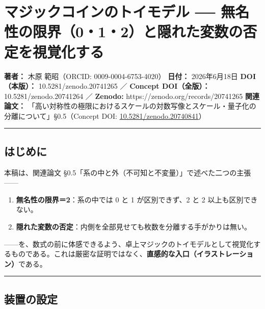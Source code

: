 \documentclass[11pt]{ltjsarticle}
\providecommand{\tightlist}{\setlength{\itemsep}{0pt}\setlength{\parskip}{0pt}}
\begin{document}
\section{マジックコインのトイモデル ──
無名性の限界（0・1・2）と隠れた変数の否定を視覚化する}\label{ux30deux30b8ux30c3ux30afux30b3ux30a4ux30f3ux306eux30c8ux30a4ux30e2ux30c7ux30eb-ux7121ux540dux6027ux306eux9650ux754c012ux3068ux96a0ux308cux305fux5909ux6570ux306eux5426ux5b9aux3092ux8996ux899aux5316ux3059ux308b}

\textbf{著者：} 木原 範昭（ORCID: 0009-0004-6753-4020） \textbf{日付：}
2026年6月18日 \textbf{DOI（本版）：} 10.5281/zenodo.20741265 ／
\textbf{Concept DOI（全版）：} 10.5281/zenodo.20741264 ／
\textbf{Zenodo:} https://zenodo.org/records/20741265 \textbf{関連論文：}
「高い対称性の極限におけるスケールの対数写像とスケール・量子化の分離について」§0.5（Concept
DOI:
\href{https://doi.org/10.5281/zenodo.20740841}{10.5281/zenodo.20740841}）

\begin{center}\rule{0.5\linewidth}{0.5pt}\end{center}

\subsection{はじめに}\label{ux306fux3058ux3081ux306b}

本稿は、関連論文
§0.5「系の中と外（不可知と不変量）」で述べた二つの主張------

\begin{enumerate}
\def\labelenumi{\arabic{enumi}.}
\tightlist
\item
  \textbf{無名性の限界＝2}：系の中では 0 と 1 が区別できず、2 と 2
  以上も区別できない。
\item
  \textbf{隠れた変数の否定}：内側を全部見せても枚数を分離する手がかりは無い。
\end{enumerate}

------を、数式の前に体感できるよう、卓上マジックのトイモデルとして視覚化するものである。これは厳密な証明ではなく、\textbf{直感的な入口（イラストレーション）}である。

\begin{center}\rule{0.5\linewidth}{0.5pt}\end{center}

\subsection{装置の設定}\label{ux88c5ux7f6eux306eux8a2dux5b9a}
\end{document}
